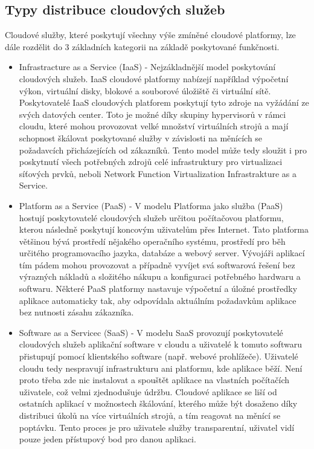 \subsection{Typy distribuce cloudových služeb}

Cloudové služby, které poskytují všechny výše zmíněné cloudové platformy, lze dále rozdělit do 3 základních kategorii na základě poskytované funkčnosti. 

\begin{itemize}
\item Infrastracture as a Service (IaaS) - Nejzákladnější  model  poskytování  cloudových  služeb. IaaS cloudové platformy nabízejí například výpočetní výkon, virtuální disky, blokové a souborové úložiště či virtuální sítě.  Poskytovatelé  IaaS  cloudových  platforem  poskytují tyto zdroje na vyžádání ze svých datových center. Toto je možné díky skupiny hypervisorů v rámci cloudu, které mohou provozovat velké množství virtuálních strojů  a  mají  schopnost  škálovat  poskytované  služby v  závislosti  na  měnících  se požadavcích přicházejících od zákazníků. Tento model může tedy sloužit i pro poskytnutí všech potřebných zdrojů celé infrastruktury pro virtualizaci síťových prvků, neboli Network Function Virtualization Infrastrakture as a Service.

\item Platform as a Service (PaaS) - V  modelu  Platforma  jako  služba  (PaaS)  hostují  poskytovatelé cloudových  služeb určitou počítačovou  platformu, kterou následně poskytují koncovým uživatelům přes Internet. Tato platforma většinou bývá prostředí nějakého operačního systému, prostředí  pro  běh  určitého programovacího  jazyka,  databáze  a  webový  server.  Vývojáři  aplikací tím pádem  mohou provozovat a případně vyvíjet svá softwarová řešení bez výrazných nákladů a složitého nákupu a konfiguraci potřebného hardwaru a softwaru. Některé PaaS platformy nastavuje výpočetní  a  úložné  prostředky  aplikace  automaticky  tak,  aby  odpovídala  aktuálním požadavkům aplikace bez nutnosti zásahu zákazníka. 

\item Software as a Servicec (SaaS) - V modelu SaaS provozují poskytovatelé cloudových služeb aplikační software v cloudu a uživatelé  k  tomuto  softwaru  přistupují  pomocí  klientského  software  (např.  webové prohlížeče). Uživatelé  cloudu tedy  nespravují infrastrukturu  ani platformu, kde aplikace běží.  Není  proto  třeba zde nic instalovat  a  spouštět  aplikace  na  vlastních  počítačích uživatele, což velmi zjednodušuje údržbu. Cloudové aplikace se liší od ostatních aplikací v možnostech  škálování, kterého  může  být  dosaženo  díky  distribuci  úkolů  na  více virtuálních strojů, a tím reagovat na měnící se poptávku. Tento proces je pro uživatele služby transparentní, uživatel vidí pouze jeden přístupový bod pro danou aplikaci. 
\end{itemize}

